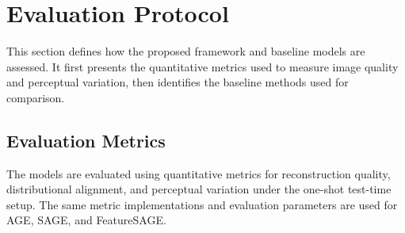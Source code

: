 \section{Evaluation Protocol}

This section defines how the proposed framework and baseline models are assessed. It first presents the quantitative metrics used to measure image quality and perceptual variation, then identifies the baseline methods used for comparison.

\subsection{Evaluation Metrics}

The models are evaluated using quantitative metrics for reconstruction quality, distributional alignment, and perceptual variation under the one-shot test-time setup. The same metric implementations and evaluation parameters are used for AGE, SAGE, and FeatureSAGE.

